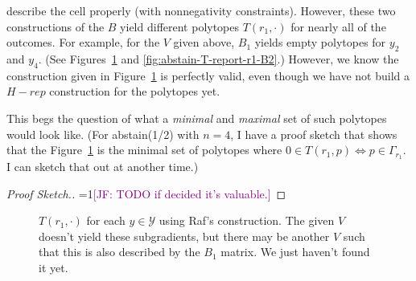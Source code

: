 \documentclass[12pt]{article}
\newcommand{\Comments}{1}
\newcommand{\mynote}[2]{\ifnum\Comments=1\textcolor{#1}{#2}\fi}
\newcommand{\jessie}[1]{\mynote{purple}{[JF: #1]}}
\newcommand{\Y}{\mathcal{Y}}
\begin{document}
describe the cell properly (with nonnegativity constraints).
However, these two constructions of the $B$ yield different polytopes $T(r_1, \cdot)$ for nearly all of the outcomes. 
For example, for the $V$ given above, $B_1$ yields empty polytopes for $y_2$ and $y_4$.
(See Figures~\ref{fig:abstain-T-report-r1-raf} and \ref{fig:abstain-T-report-r1-B2}.)
However, we know the construction given in Figure~\ref{fig:abstain-T-report-r1-raf} is perfectly valid, even though we have not build a $H-rep$ construction for the polytopes yet. 

This begs the question of what a \emph{minimal} and \emph{maximal} set of such polytopes would look like.
(For abstain(1/2) with $n=4$, I have a proof sketch that shows that the Figure~\ref{fig:abstain-T-report-r1-raf} is the minimal set of polytopes where $0 \in T(r_1, p) \iff p \in \Gamma_{r_1}$.
I can sketch that out at another time.)
\begin{proof}[Proof Sketch.]
\jessie{TODO if decided it's valuable.}
\end{proof}

\begin{figure}
\begin{minipage}{0.24\linewidth}
\end{minipage}
\begin{minipage}{0.24\linewidth}
\end{minipage}
\begin{minipage}{0.24\linewidth}
\end{minipage}
\begin{minipage}{0.24\linewidth}
\end{minipage}
\caption{$T(r_1, \cdot)$ for each $y \in \Y$ using Raf's construction.  The given $V$ doesn't yield these subgradients, but there may be another $V$ such that this is also described by the $B_1$ matrix.  We just haven't found it yet.}
\label{fig:abstain-T-report-r1-raf}
\end{figure}
\end{document}
